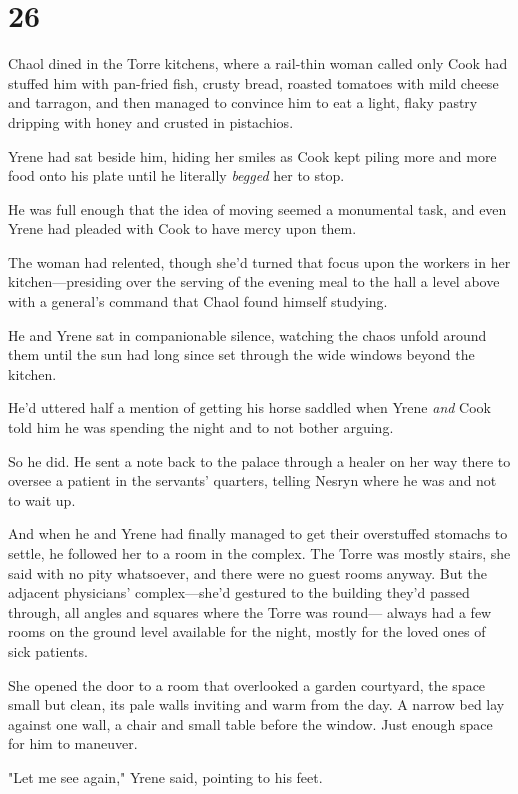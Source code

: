 
\chapter{26}

Chaol dined in the Torre kitchens, where a rail-thin woman called only Cook had stuffed him with pan-fried fish, crusty bread, roasted tomatoes with mild cheese and tarragon, and then managed to convince him to eat a light, flaky pastry dripping with honey and crusted in pistachios.

Yrene had sat beside him, hiding her smiles as Cook kept piling more and more food onto his plate until he literally \emph{begged} her to stop.

He was full enough that the idea of moving seemed a monumental task, and even Yrene had pleaded with Cook to have mercy upon them.

The woman had relented, though she'd turned that focus upon the workers in her kitchen---presiding over the serving of the evening meal to the hall a level above with a general's command that Chaol found himself studying.

He and Yrene sat in companionable silence, watching the chaos unfold around them until the sun had long since set through the wide windows beyond the kitchen.

He'd uttered half a mention of getting his horse saddled when Yrene \emph{and} Cook told him he was spending the night and to not bother arguing.

So he did.
He sent a note back to the palace through a healer on her way there to oversee a patient in the servants' quarters, telling Nesryn where he was and not to wait up.

And when he and Yrene had finally managed to get their overstuffed stomachs to settle, he followed her to a room in the complex.
The Torre was mostly stairs, she said with no pity whatsoever, and there were no guest rooms anyway.
But the adjacent physicians' complex---she'd gestured to the building they'd passed through, all angles and squares where the Torre was round--- always had a few rooms on the ground level available for the night, mostly for the loved ones of sick patients.

She opened the door to a room that overlooked a garden courtyard, the space small but clean, its pale walls inviting and warm from the day.
A narrow bed lay against one wall, a chair and small table before the window.
Just enough space for him to maneuver.

"Let me see again," Yrene said, pointing to his feet.

